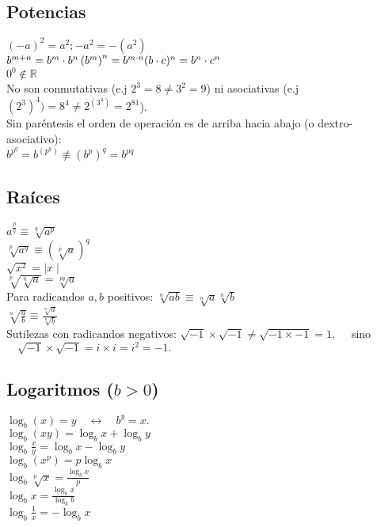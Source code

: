\subsection{Potencias}
$ (-a)^2 = a^2; -a^2 = -(a^2)$\\
$b^{m + n} = b^m \cdot b^n \\
\left(b^m\right)^n = b^{m \cdot n} \\
(b \cdot c)^n = b^n \cdot c^n$\\
$ 0^0 \notin \mathbb{R}$\\

No son conmutativas (e.j $2^3 = 8 \neq 3^2 = 9$) ni asociativas (e.j $(2^3)^4) = 8^4 \neq 2^{(3^4)} = 2^{81}$).\\

Sin paréntesis el orden de operación es de arriba hacia abajo (o dextro-asociativo):\\
$b^{p^q} = b^{\left(p^q\right)} \not\equiv \left(b^p\right)^q = b^{p q}$\\

\subsection{Raíces}
$ a ^ {\frac{p}{q}} \equiv \sqrt[q]{a^p} $\\
$ \sqrt[p]{a^q} \equiv (\sqrt[p]{a})^q $\\
$\sqrt{x^2} = \mid x \mid$\\
$\sqrt[p]{\sqrt[q]{a}} = \sqrt[pq]{a}$\\
Para radicandos $a, b$ positivos:
$\sqrt[n]{ab} \equiv \sqrt[n]{a} \sqrt[n]{b}$\\
$\sqrt[n]{\frac{a}{b}} \equiv \frac{\sqrt[n]{a}}{\sqrt[n]{b}}$\\
Sutilezas con radicandos negativos:
$\sqrt{-1}\times\sqrt{-1} \neq \sqrt{-1 \times -1} = 1,\quad$ sino $\quad\sqrt{-1}\times\sqrt{-1} = i \times i = i^2 = -1.$\\

\subsection{Logaritmos ($b > 0$)}
$\log_b(x) = y \quad \leftrightarrow \quad b^y = x.$\\
$\log_b(xy) = \log_b x + \log_b y$\\
$\log_b \!\frac{x}{y} = \log_b x - \log_b y$\\
$\log_b\left(x^p\right) = p \log_b x$\\
$\log_b \sqrt[p]{x} = \frac{\log_b x}{p}$\\
$\log_b x = \frac{\log_k x}{\log_k b}$\\
$\log_b \frac{1}{x} = -\log_b x$

